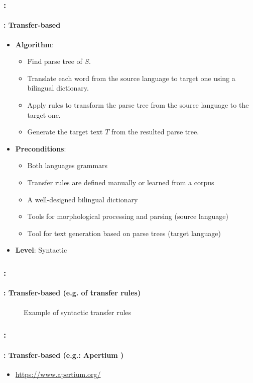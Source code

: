 \documentclass[xcolor=table]{beamer}
\begin{document}
\begin{frame}
	\frametitle{\insertshortsubtitle: \insertsection}
	\framesubtitle{\insertsubsection: Transfer-based}
	
	\begin{itemize}
		\item \textbf{Algorithm}:
		\begin{itemize}
			\item Find parse tree of $S$.
			\item Translate each word from the source language to target one using a bilingual dictionary.
			\item Apply rules to transform the parse tree from the source language to the target one.
			\item Generate the target text $T$ from the resulted parse tree.
		\end{itemize}
		\item \textbf{Preconditions}:
		\begin{itemize}
			\item Both languages grammars
			\item Transfer rules are defined manually or learned from a corpus
			\item A well-designed bilingual dictionary
			\item Tools for morphological processing and parsing (source language)
			\item Tool for text generation based on parse trees (target language)
		\end{itemize}
		\item \textbf{Level}: Syntactic
	\end{itemize}

\end{frame}

\begin{frame}
	\frametitle{\insertshortsubtitle: \insertsection}
	\framesubtitle{\insertsubsection: Transfer-based (e.g. of transfer rules)}

	\begin{figure}
		\centering
		\caption{Example of syntactic transfer rules \cite{06-quah}}
	\end{figure}

\end{frame}

\begin{frame}
	\frametitle{\insertshortsubtitle: \insertsection}
	\framesubtitle{\insertsubsection: Transfer-based (e.g.: Apertium \cite{11-forcada-al})}
	
	\begin{itemize}
		\item \url{https://www.apertium.org/}
	\end{itemize}

	
\end{frame}
\end{document}
